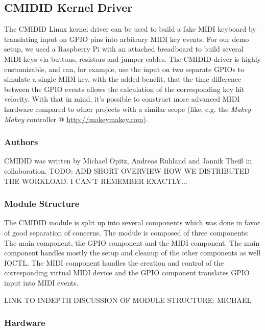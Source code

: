 \documentclass{sig-alternate}
\begin{document}
\subsection{CMIDID Kernel Driver}
\label{overview:cmidid}

The CMIDID Linux kernel driver can be used to build a fake MIDI keyboard 
by translating input on GPIO pins into arbitrary MIDI key events. For our 
demo setup, we used a Raspberry Pi with an attached breadboard to build
several MIDI keys via buttons, resistors and jumper cables. The CMIDID driver 
is highly customizable, and can, for example, use the input on two separate 
GPIOs to simulate a single MIDI key, with the added benefit, that the time 
difference between the GPIO events allows the calculation of the corresponding 
key hit velocity. With that in mind, it's possible to construct more advanced 
MIDI hardware compared to other projects with a similar scope (like, e.g. the 
\emph{Makey Makey} controller @ \url{http://makeymakey.com}).

\subsubsection{Authors}
\label{cmidid:authors}

CMIDID was written by Michael Opitz, Andreas Ruhland and Jannik Theiß in 
collaboration. TODO: ADD SHORT OVERVIEW HOW WE DISTRIBUTED THE WORKLOAD.
I CAN'T REMEMBER EXACTLY...

\subsubsection{Module Structure}
\label{cmidid:structure}

The CMIDID module is split up into several components which was done in 
favor of good separation of concerns. The module is composed of three 
components: The main component, the GPIO component and the MIDI component.
The main component handles mostly the setup and cleanup of the other 
components as well IOCTL. The MIDI component handles the creation and control 
of the corresponding virtual MIDI device and the GPIO component translates 
GPIO input into MIDI events.

LINK TO INDEPTH DISCUSSION OF MODULE STRUCTURE: MICHAEL

\subsubsection{Hardware}
\label{cmidid:hardware}
\end{document}
